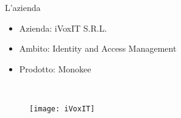 \begin{tframe}{L'azienda}
\begin{itemize}
\item Azienda: iVoxIT S.R.L.
\item Ambito: Identity and Access Management
\item Prodotto: Monokee
\end{itemize}

\mbox{} \\

\begin{figure}[h]
\centering
\texttt{[image: iVoxIT]}
\end{figure}

\end{tframe}